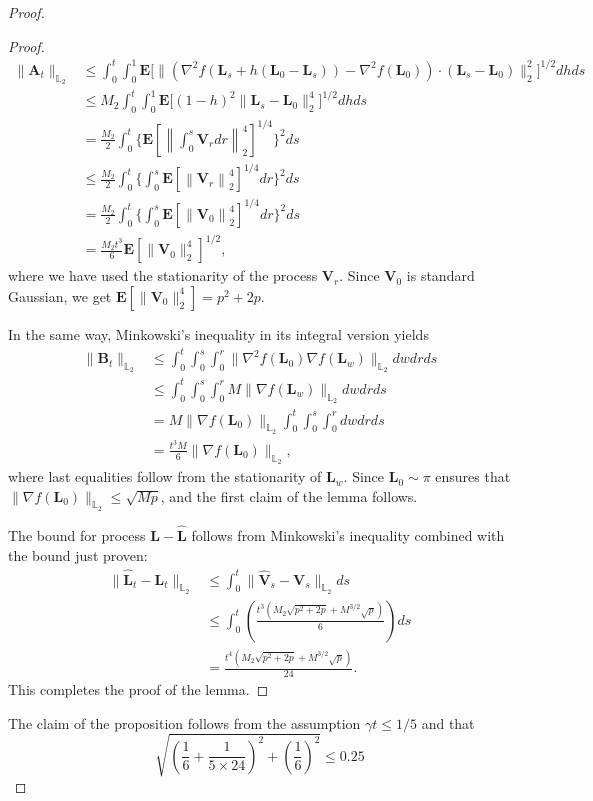 \documentclass[a4paper,bej,preprint,reqno]{imsart}
\newcommand\bB{\boldsymbol B}
\newcommand\bfE{\mathbf E}
\newcommand\bL{\boldsymbol L}
\newcommand\bA{\boldsymbol A}
\newcommand\bV{\boldsymbol V}
\newcommand\LL{\mathbb L}
\def\hat{\widehat}
\begin{document}
\begin{proof}
\begin{proof}
\begin{align}
    \|\bA_t\|_{{\LL}_2}&\le\int_0^t\int_0^1\bfE\Big[\|\left(\nabla^2f(\bL_s+h(\bL_0-\bL_s))-\nabla^2f(\bL_0)\right)\cdot(\bL_s-\bL_0)\|_2^2\Big]^{1/2}dhds\\
    &\le M_2\int_0^t\int_0^1\bfE\Big[(1-h)^2\|\bL_s-\bL_0\|_2^4\Big]^{1/2}dhds\\
    &=\frac{M_2}{2}\int_0^t\bigg\{\bfE\left[\left\|\int_0^s\bV_r dr\right\|_{2}^4\right]^{1/4}\bigg\}^2ds\\
		&\le\frac{M_2}{2}\int_0^t\bigg\{\int_0^s\bfE\left[\left\|\bV_r \right\|_{2}^4\right]^{1/4}dr\bigg\}^2ds\\
		&=\frac{M_2}{2}\int_0^t\bigg\{\int_0^s\bfE\left[\left\|\bV_0 \right\|_{2}^4\right]^{1/4}dr\bigg\}^2ds\\
    &=\frac{M_2t^3}{6}\bfE\left[\|\bV_0\|_2^4\right]^{1/2},
\end{align}
where we have used the stationarity of the process $\bV_r$.
Since $\bV_0$ is standard Gaussian, we get $\bfE\left[\|\bV_0\|_2^4\right]=
p^2+2p$.


In the same way, Minkowski's inequality in its integral version yields
\begin{align}
    \|\bB_t\|_{{\LL}_2}&\le\int_0^t\int_0^s\int_0^r\|\nabla^2 f(\bL_0)\nabla f(\bL_w)\|_{{\LL}_2}dwdrds\\
    &\le \int_0^t\int_0^s\int_0^rM\|\nabla f(\bL_w)\|_{{\LL}_2}dwdrds\\
    &=M\|\nabla f(\bL_0)\|_{{\LL}_2}\int_0^t\int_0^s\int_0^rdwdrds\\
    &=\frac{t^3M}{6}\|\nabla f(\bL_0)\|_{{\LL}_2},
\end{align}
where last equalities follow from the stationarity of $\bL_w$.
Since $\bL_0\sim\pi$ \citep[Lemma 2]{DalalyanColt} ensures that $\|\nabla f(\bL_0)\|_{{\LL}_2}\le\sqrt{Mp}$, and the first claim of the lemma follows.

The bound for process $\bL-\hat{\bL}$ follows from Minkowski's inequality combined with the bound just proven:
\begin{align}
    \|\hat{\bL}_t-\bL_t\|_{{\LL}_2}&\le\int_0^t\|\hat{\bV}_s -\bV_s\|_{{\LL}_2}ds\\
    &\le\int_0^t\left(\frac{t^3(M_2\sqrt{p^2+2p}+M^{3/2}\sqrt{p})}{6}\right)ds\\
    &=\frac{t^4(M_2\sqrt{p^2+2p}+M^{3/2}\sqrt{p})}{24}.
\end{align}
This completes the proof of the lemma.
\end{proof}
The claim of the proposition follows from the assumption $\gamma t\le1/5$
and that
$$
\sqrt{\left(\frac16+\frac{1}{5\times24}\right)^2+\left(\frac16\right)^2}\le0.25
$$
\end{proof}
\end{document}
